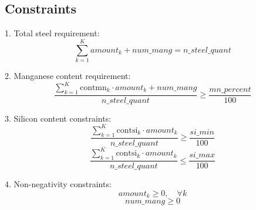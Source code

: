 \documentclass{article}
\begin{document}
\subsection*{Constraints}
1. Total steel requirement:
\[
\sum_{k=1}^{K} amount_k + num\_mang = n\_steel\_quant
\]

2. Manganese content requirement:
\[
\frac{\sum_{k=1}^{K} \text{contmn}_k \cdot amount_k + num\_mang}{n\_steel\_quant} \geq \frac{mn\_percent}{100}
\]

3. Silicon content constraints:
\[
\frac{\sum_{k=1}^{K} \text{contsi}_k \cdot amount_k}{n\_steel\_quant} \geq \frac{si\_min}{100}
\]
\[
\frac{\sum_{k=1}^{K} \text{contsi}_k \cdot amount_k}{n\_steel\_quant} \leq \frac{si\_max}{100}
\]

4. Non-negativity constraints:
\[
amount_k \geq 0, \quad \forall k
\]
\[
num\_mang \geq 0
\]
\end{document}
